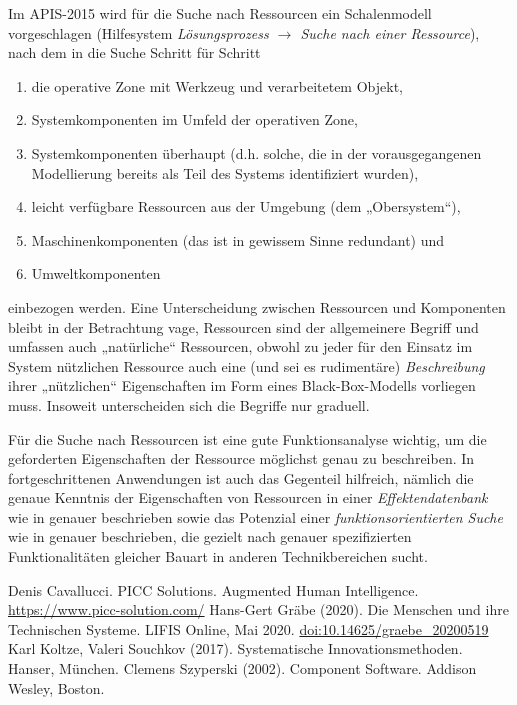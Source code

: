 \documentclass[11pt,a4paper]{article}
\begin{document}
Im APIS-2015 wird für die Suche nach Ressourcen ein Schalenmodell
vorgeschlagen (Hilfesystem \emph{Lösungsprozess $\to$ Suche nach einer
  Ressource}), nach dem in die Suche Schritt für Schritt
\begin{enumerate}[noitemsep]
\item die operative Zone mit Werkzeug und verarbeitetem Objekt,
\item Systemkomponenten im Umfeld der operativen Zone,
\item Systemkomponenten überhaupt (d.h. solche, die in der vorausgegangenen
  Modellierung bereits als Teil des Systems identifiziert wurden),
\item leicht verfügbare Ressourcen aus der Umgebung (dem „Obersystem“),
\item Maschinenkomponenten (das ist in gewissem Sinne redundant) und
\item Umweltkomponenten
\end{enumerate}
einbezogen werden. Eine Unterscheidung zwischen Ressourcen und Komponenten
bleibt in der Betrachtung vage, Ressourcen sind der allgemeinere Begriff und
umfassen auch „natürliche“ Ressourcen, obwohl zu jeder für den Einsatz im
System nützlichen Ressource auch eine (und sei es rudimentäre)
\emph{Beschreibung} ihrer „nützlichen“ Eigenschaften im Form eines
Black-Box-Modells vorliegen muss. Insoweit unterscheiden sich die Begriffe nur
graduell. 

Für die Suche nach Ressourcen ist eine gute Funktionsanalyse \cite[Abschnitt
  4.4]{Koltze2017} wichtig, um die geforderten Eigenschaften der Ressource
möglichst genau zu beschreiben.  In fortgeschrittenen Anwendungen ist auch das
Gegenteil hilfreich, nämlich die genaue Kenntnis der Eigenschaften von
Ressourcen in einer \emph{Effektendatenbank} wie in \cite[Abschnitt
  8.2]{Koltze2017} genauer beschrieben sowie das Potenzial einer
\emph{funktionsorientierten Suche} wie in \cite[Abschnitt 4.14]{Koltze2017}
genauer beschrieben, die gezielt nach genauer spezifizierten Funktionalitäten
gleicher Bauart in anderen Technikbereichen sucht. 
\newpage

\begin{thebibliography}{xxx}
 Denis Cavallucci. PICC Solutions. Augmented Human
  Intelligence.  \url{https://www.picc-solution.com/}
 Hans-Gert Gräbe (2020). Die Menschen und ihre Technischen
  Systeme. LIFIS Online, Mai 2020. \url{doi:10.14625/graebe_20200519}
 Karl Koltze, Valeri Souchkov (2017). Systematische
  Innovationsmethoden. Hanser, München. 
 Clemens Szyperski (2002). Component Software. Addison
  Wesley, Boston. 
\end{thebibliography}
\end{document}
